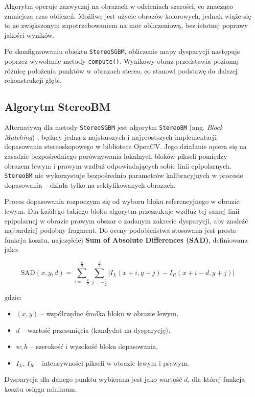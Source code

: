 \documentclass[magisterska]{pracadypl}
\begin{document}
Algorytm operuje zazwyczaj na obrazach w odcieniach szarości, co znacząco zmniejsza czas obliczeń. Możliwe jest użycie obrazów kolorowych, jednak wiąże się to ze zwiększonym zapotrzebowaniem na moc obliczeniową, bez istotnej poprawy jakości wyników.

Po skonfigurowaniu obiektu \texttt{StereoSGBM}, obliczenie mapy dysparycji następuje poprzez wywołanie metody \texttt{compute()}. Wynikowy obraz przedstawia poziomą różnicę położenia punktów w obrazach stereo, co stanowi podstawę do dalszej rekonstrukcji głębi.

\subsection{Algorytm StereoBM}

Alternatywą dla metody \texttt{StereoSGBM} jest algorytm \texttt{StereoBM} (ang. \textit{Block Matching}) \cite{bm}, będący jedną z najstarszych i najprostszych implementacji dopasowania stereoskopowego w bibliotece OpenCV. Jego działanie opiera się na zasadzie bezpośredniego porównywania lokalnych bloków pikseli pomiędzy obrazem lewym i prawym wzdłuż odpowiadających sobie linii epipolarnych. \texttt{StereoBM} nie wykorzystuje bezpośrednio parametrów kalibracyjnych w procesie dopasowania – działa tylko na rektyfikowanych obrazach. 

Proces dopasowania rozpoczyna się od wyboru bloku referencyjnego w obrazie lewym. Dla każdego takiego bloku algorytm przeszukuje wzdłuż tej samej linii epipolarnej w obrazie prawym obszar o zadanym zakresie dysparycji, aby znaleźć najbardziej podobny fragment. Do oceny podobieństwa stosowana jest prosta funkcja kosztu, najczęściej \textbf{Sum of Absolute Differences (SAD)}, definiowana jako:

\[
\text{SAD}(x,y,d) = \sum_{i=-\frac{w}{2}}^{\frac{w}{2}} \sum_{j=-\frac{h}{2}}^{\frac{h}{2}} | I_L(x+i,y+j) - I_R(x+i-d,y+j) |
\]

gdzie:
\begin{itemize}
    \item $(x,y)$ -- współrzędne środka bloku w obrazie lewym,
    \item $d$ -- wartość przesunięcia (kandydat na dysparycję),
    \item $w,h$ -- szerokość i wysokość bloku dopasowania,
    \item $I_L$, $I_R$ -- intensywności pikseli w obrazie lewym i prawym.
\end{itemize}

Dysparycja dla danego punktu wybierana jest jako wartość $d$, dla której funkcja kosztu osiąga minimum.  
\end{document}
